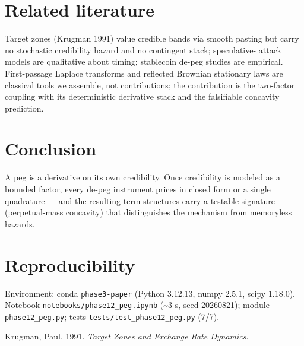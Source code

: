 \documentclass[
  english,
  10pt,
  letterpaper,
  DIV=11,
  numbers=noendperiod]{scrartcl}
\newlength{\cslhangindent}
\newenvironment{CSLReferences}[2] %
 {\begin{list}{}{%
  \setlength{\itemindent}{0pt}
  \setlength{\leftmargin}{0pt}
  \setlength{\parsep}{0pt}
  \ifodd #1
   \setlength{\leftmargin}{\cslhangindent}
   \setlength{\itemindent}{-1\cslhangindent}
  \fi
  \setlength{\itemsep}{#2\baselineskip}}}
 {\end{list}}
\begin{document}
\section{Related literature}\label{sec-related}

Target zones (Krugman 1991) value credible bands via smooth pasting but
carry no stochastic credibility hazard and no contingent stack;
speculative- attack models are qualitative about timing; stablecoin
de-peg studies are empirical. First-passage Laplace transforms and
reflected Brownian stationary laws are classical tools we assemble, not
contributions; the contribution is the two-factor coupling with its
deterministic derivative stack and the falsifiable concavity prediction.

\section{Conclusion}\label{sec-conclusion}

A peg is a derivative on its own credibility. Once credibility is
modeled as a bounded factor, every de-peg instrument prices in closed
form or a single quadrature --- and the resulting term structures carry
a testable signature (perpetual-mass concavity) that distinguishes the
mechanism from memoryless hazards.

\section{Reproducibility}\label{sec-repro}

Environment: conda \texttt{phase3-paper} (Python 3.12.13, numpy 2.5.1,
scipy 1.18.0). Notebook \texttt{notebooks/phase12\_peg.ipynb}
(\textasciitilde3 s, seed 20260821); module \texttt{phase12\_peg.py};
tests \texttt{tests/test\_phase12\_peg.py} (7/7).

\protect{}\label{refs}
\begin{CSLReferences}{1}{1}
Krugman, Paul. 1991. \emph{Target Zones and Exchange Rate Dynamics}.

\end{CSLReferences}
\end{document}
